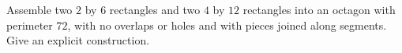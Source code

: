 Assemble two $2$ by $6$ rectangles and two $4$ by $12$ rectangles into an octagon with perimeter $72$, with no overlaps or holes and with pieces joined along segments. Give an explicit construction.

